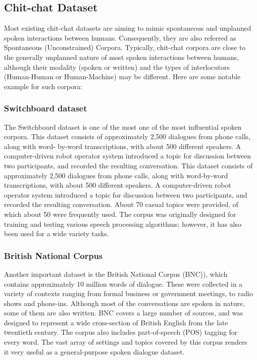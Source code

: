 \documentclass[bsc,frontabs,twoside,singlespacing,parskip,deptreport]{infthesis}     %
\begin{document}
\subsection{Chit-chat Dataset}

Most existing chit-chat datasets are aiming to mimic spontaneous and unplanned spoken interactions between humans. Consequently, they are also referred as Spontaneous (Unconstrained) Corpora. Typically, chit-chat corpora are close to the generally unplanned nature of most spoken interactions between humans, although their modality (spoken or written) and the types of interlocutors (Human-Human or Human-Machine) may be different. Here are some notable example for such corpora:

\subsubsection{Switchboard dataset}

The Switchboard dataset\cite{godfrey1992switchboard} is one of the most one of the most influential spoken corpora. This dataset consists of approximately 2,500 dialogues from phone calls, along with word- by-word transcriptions, with about 500 different speakers. A computer-driven robot operator system introduced a topic for discussion between two participants, and recorded the resulting conversation. This dataset consists of approximately 2,500 dialogues from phone calls, along with word-by-word transcriptions, with about 500 different speakers. A computer-driven robot operator system introduced a topic for discussion between two participants, and recorded the resulting conversation. About 70 casual topics were provided, of which about 50 were frequently used. The corpus was originally designed for training and testing various speech processing algorithms; however, it has also been used for a wide variety tasks.

\subsubsection{British National Corpus}

Another important dataset is the British National Corpus (BNC)\cite{leech1992100}), which contains approximately 10 million words of dialogue. These were collected in a variety of contexts ranging from formal business or government meetings, to radio shows and phone-ins. Although most of the conversations are spoken in nature, some of them are also written. BNC covers a large number of sources, and was designed to represent a wide cross-section of British English from the late twentieth century. The corpus also includes part-of-speech (POS) tagging for every word. The vast array of settings and topics covered by this corpus renders it very useful as a general-purpose spoken dialogue dataset.
\end{document}
